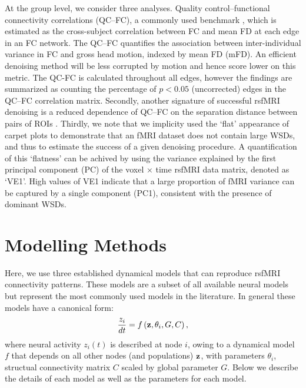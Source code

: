 \documentclass[oneside]{zHenriquesLab-StyleBioRxiv}
\begin{document}
At the group level, we consider three analyses. Quality control--functional connectivity correlations (QC--FC), a commonly used benchmark \cite{ciric2017benchmarking,Parkes:2018dz,power2017sources}, which is estimated as the cross-subject correlation between FC and mean FD at each edge in an FC network. The QC--FC quantifies the association between inter-individual variance in FC and gross head motion, indexed by mean FD (mFD). An efficient denoising method will be less corrupted by motion and hence score lower on this metric. The QC-FC is calculated throughout all edges, however the findings are summarized as counting the percentage of $p < 0.05$ (uncorrected) edges in the QC--FC correlation matrix. Secondly, another signature of successful rsfMRI denoising is a reduced dependence of QC--FC on the separation distance between pairs of ROIs \cite{Parkes:2018dz, satterthwaite2012impact}. Thirdly, we note that we implicity used the `flat' appearance of carpet plots to demonstrate that an fMRI dataset does not contain large WSDs, and thus to estimate the success of a given denoising procedure. A quantification of this `flatness' can be achived by using the variance explained by the first principal component (PC) of the voxel $\times$ time rsfMRI data matrix, denoted as `VE1'.
High values of VE1 indicate that a large proportion of fMRI variance can be captured by a single component (PC1), consistent with the presence of dominant WSDs. 

\section*{Modelling Methods}

Here, we use three established dynamical models that can reproduce rsfMRI connectivity patterns. These models are a subset of all available neural models but represent the most commonly used models in the literature. In general these models have a canonical form:
\begin{equation}
\frac{z_i}{dt} = f\left({\bf z},\theta_i,G,C\right),
\end{equation}
where neural activity $z_i(t)$ is described at node $i$, owing to a dynamical model $f$ that depends on all other nodes (and populations) $\bf{z}$, with parameters $\theta_i$, structual connectivity matrix $C$ scaled by global parameter $G$. Below we describe the details of each model as well as the parameters for each model. 
\end{document}
